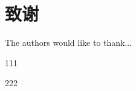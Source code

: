 \documentclass[journal]{IEEEtran}
\begin{document}
\section*{致谢}


The authors would like to thank...


\ifCLASSOPTIONcaptionsoff
  \newpage
\fi



\begin{thebibliography}{1}

111

222

\end{thebibliography}


\end{document}
